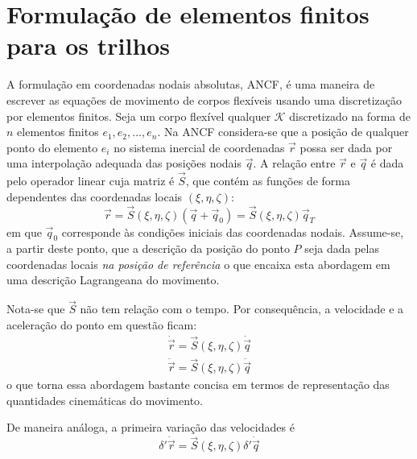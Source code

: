 \chapter{Formulação de elementos finitos para os trilhos}

A formulação em coordenadas nodais absolutas, ANCF, é uma maneira de escrever as equações de movimento de corpos
flexíveis usando uma discretização por elementos finitos. Seja um corpo flexível qualquer $\mathcal{K}$ discretizado
na forma de $n$ elementos finitos $e_1,e_2,...,e_n$. Na ANCF considera-se que a posição de qualquer ponto do elemento
$e_i$ no sistema inercial de coordenadas $\vec{r}$ possa ser dada por uma interpolação adequada
das posições nodais $\vec{q}$. A relação entre $\vec{r}$ e $\vec{q}$ é dada pelo operador linear cuja matriz é $\vec{S}$, 
que contém as funções de forma dependentes das coordenadas locais $\left(\xi,\eta,\zeta\right)$:
\begin{equation}
    \vec{r} = \vec{S}\left(\xi,\eta,\zeta\right) \left(\vec{q} +\vec{q}_{0}\right) = \vec{S}\left(\xi,\eta,\zeta\right) \vec{q}_T
    \label{eq: posi_ANCF}
\end{equation}
em que $\vec{q}_{0}$ corresponde às condições iniciais das coordenadas nodais. Assume-se, a partir deste ponto,
que a descrição da posição do ponto $P$ seja dada pelas coordenadas locais \textit{na posição de referência} o
que encaixa esta abordagem em uma descrição Lagrangeana do movimento.

Nota-se que $\vec{S}$ não tem relação com o tempo. Por consequência, a velocidade e a aceleração 
do ponto em questão ficam:
\begin{align}
    \dot{\vec{r}} = \vec{S}\left(\xi,\eta,\zeta\right) \dot{\vec{q}} \label{eq: vel_ANCF} \\
    \ddot{\vec{r}} = \vec{S}\left(\xi,\eta,\zeta\right) \ddot{\vec{q}} \label{eq: acel_ANCF}
\end{align}
o que torna essa abordagem bastante concisa em termos de representação das quantidades cinemáticas 
do movimento.

De maneira análoga, a primeira variação das velocidades é
\begin{equation}
    \delta'\dot{\vec{r}} = \vec{S}\left(\xi,\eta,\zeta\right) \delta'\dot{\vec{q}} \label{eq: vari_velo_nodal}
\end{equation}

